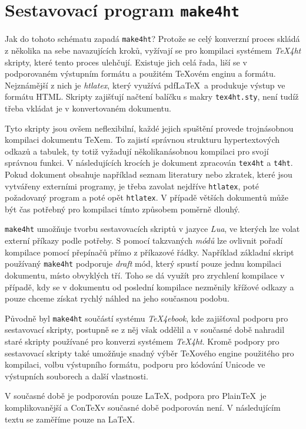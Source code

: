 \documentclass{csbulletin}
\newcommand\nazev[1]{\textit{#1}}
\newcommand\prikaz[1]{\texttt{#1}}
\begin{document}
\section{Sestavovací program \prikaz{make4ht}}

Jak do tohoto schématu zapadá \prikaz{make4ht}? Protože se celý konverzní proces
skládá z několika na sebe navazujících kroků, vyžívají se pro kompilaci
systémem \nazev{TeX4ht} skripty, které tento proces ulehčují. Existuje jich
celá řada, liší se v podporovaném výstupním formátu a použitém \TeX ovém enginu
a formátu. Nejznámější z nich je \nazev{htlatex}, který využívá pdf\LaTeX\ a
produkuje výstup ve formátu HTML. Skripty zajišťují načtení balíčku s makry
\prikaz{tex4ht.sty}, není tudíž třeba vkládat je v konvertovaném dokumentu.

Tyto skripty jsou ovšem neflexibilní, každé jejich spuštění provede
trojnásobnou kompilaci dokumentu \TeX em. To zajistí správnou strukturu
hypertextových odkazů a tabulek, ty totiž vyžadují několikanásobnou kompilaci
pro svojí správnou funkci. V následujících krocích je dokument zpracován
\prikaz{tex4ht} a \prikaz{t4ht}. Pokud dokument obsahuje například seznam
literatury nebo zkratek, které jsou vytvářeny externími programy, je třeba
zavolat nejdříve \prikaz{htlatex}, poté požadovaný program a poté opět
\prikaz{htlatex}. V případě větších dokumentů může být čas potřebný pro
kompilaci tímto způsobem poměrně dlouhý.

\prikaz{make4ht} umožňuje tvorbu sestavovacích skriptů v jazyce \nazev{Lua}, ve
kterých lze volat externí příkazy podle potřeby. S pomocí takzvaných
\nazev{módů} lze ovlivnit pořadí kompilace pomocí přepínačů přímo z příkazové
řádky. Například základní skript používaný \prikaz{make4ht} podporuje
\nazev{draft} mód, který spustí pouze jednu kompilaci dokumentu, místo
obvyklých tří. Toho se dá využít pro zrychlení kompilace v případě, kdy se v
dokumentu od poslední kompilace nezměnily křížové odkazy a pouze chceme získat
rychlý náhled na jeho současnou podobu.

Původně byl \prikaz{make4ht} součástí systému \nazev{TeX4ebook}, kde zajišťoval
podporu pro sestavovací skripty, postupně se z něj však oddělil a v současné
době nahradil staré skripty používané pro konverzi systémem \nazev{TeX4ht}. 
Kromě podpory pro sestavovací skripty také umožňuje snadný výběr \TeX ového
engine použitého pro kompilaci, volbu výstupního formátu, podporu pro kódování
Unicode ve výstupních souborech a další vlastnosti.

V současné době je podporován pouze \LaTeX, podpora pro Plain\TeX\ je
komplikovanější a Con\TeX v současné době podporován není. V následujícím textu
se zaměříme pouze na \LaTeX.
\end{document}
